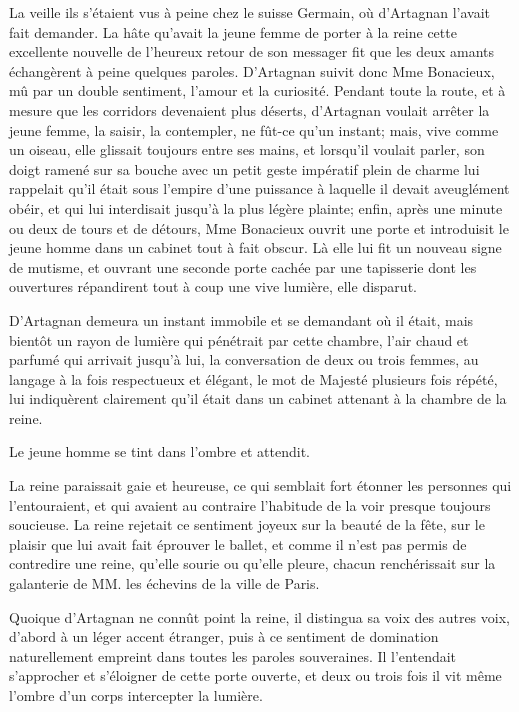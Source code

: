 La veille ils s'étaient vus à peine chez le suisse Germain, où d'Artagnan l'avait fait demander. La hâte qu'avait la jeune femme de porter à la reine cette excellente nouvelle de l'heureux retour de son messager fit que les deux amants échangèrent à peine quelques paroles. D'Artagnan suivit donc Mme Bonacieux, mû par un double sentiment, l'amour et la curiosité. Pendant toute la route, et à mesure que les corridors devenaient plus déserts, d'Artagnan voulait arrêter la jeune femme, la saisir, la contempler, ne fût-ce qu'un instant; mais, vive comme un oiseau, elle glissait toujours entre ses mains, et lorsqu'il voulait parler, son doigt ramené sur sa bouche avec un petit geste impératif plein de charme lui rappelait qu'il était sous l'empire d'une puissance à laquelle il devait aveuglément obéir, et qui lui interdisait jusqu'à la plus légère plainte; enfin, après une minute ou deux de tours et de détours, Mme Bonacieux ouvrit une porte et introduisit le jeune homme dans un cabinet tout à fait obscur. Là elle lui fit un nouveau signe de mutisme, et ouvrant une seconde porte cachée par une tapisserie dont les ouvertures répandirent tout à coup une vive lumière, elle disparut. 

D'Artagnan demeura un instant immobile et se demandant où il était, mais bientôt un rayon de lumière qui pénétrait par cette chambre, l'air chaud et parfumé qui arrivait jusqu'à lui, la conversation de deux ou trois femmes, au langage à la fois respectueux et élégant, le mot de Majesté plusieurs fois répété, lui indiquèrent clairement qu'il était dans un cabinet attenant à la chambre de la reine. 

Le jeune homme se tint dans l'ombre et attendit. 

La reine paraissait gaie et heureuse, ce qui semblait fort étonner les personnes qui l'entouraient, et qui avaient au contraire l'habitude de la voir presque toujours soucieuse. La reine rejetait ce sentiment joyeux sur la beauté de la fête, sur le plaisir que lui avait fait éprouver le ballet, et comme il n'est pas permis de contredire une reine, qu'elle sourie ou qu'elle pleure, chacun renchérissait sur la galanterie de MM. les échevins de la ville de Paris. 

Quoique d'Artagnan ne connût point la reine, il distingua sa voix des autres voix, d'abord à un léger accent étranger, puis à ce sentiment de domination naturellement empreint dans toutes les paroles souveraines. Il l'entendait s'approcher et s'éloigner de cette porte ouverte, et deux ou trois fois il vit même l'ombre d'un corps intercepter la lumière. 

